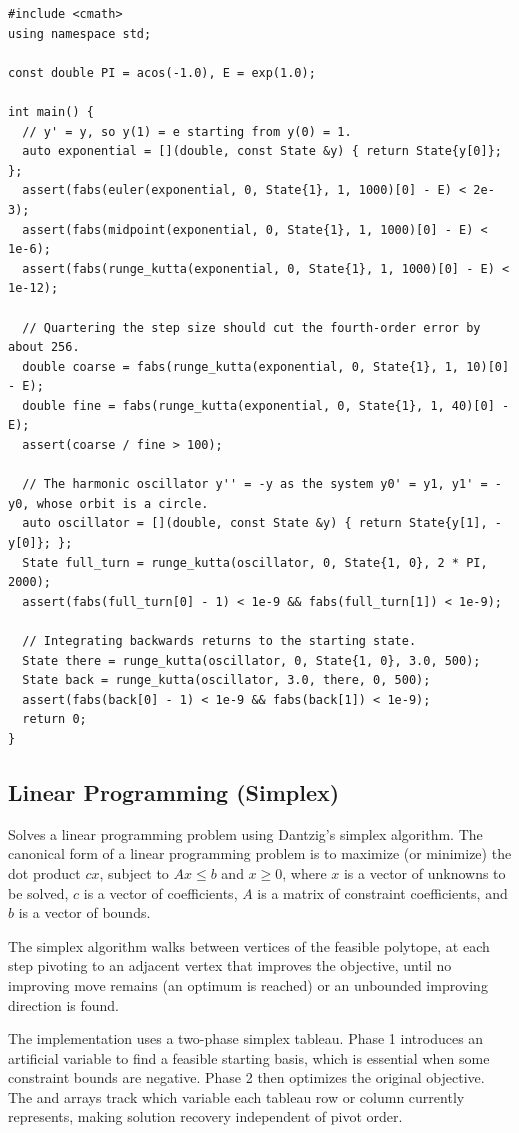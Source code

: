 \begin{lstlisting}[style=cpp]
#include <cmath>
using namespace std;

const double PI = acos(-1.0), E = exp(1.0);

int main() {
  // y' = y, so y(1) = e starting from y(0) = 1.
  auto exponential = [](double, const State &y) { return State{y[0]}; };
  assert(fabs(euler(exponential, 0, State{1}, 1, 1000)[0] - E) < 2e-3);
  assert(fabs(midpoint(exponential, 0, State{1}, 1, 1000)[0] - E) < 1e-6);
  assert(fabs(runge_kutta(exponential, 0, State{1}, 1, 1000)[0] - E) < 1e-12);

  // Quartering the step size should cut the fourth-order error by about 256.
  double coarse = fabs(runge_kutta(exponential, 0, State{1}, 1, 10)[0] - E);
  double fine = fabs(runge_kutta(exponential, 0, State{1}, 1, 40)[0] - E);
  assert(coarse / fine > 100);

  // The harmonic oscillator y'' = -y as the system y0' = y1, y1' = -y0, whose orbit is a circle.
  auto oscillator = [](double, const State &y) { return State{y[1], -y[0]}; };
  State full_turn = runge_kutta(oscillator, 0, State{1, 0}, 2 * PI, 2000);
  assert(fabs(full_turn[0] - 1) < 1e-9 && fabs(full_turn[1]) < 1e-9);

  // Integrating backwards returns to the starting state.
  State there = runge_kutta(oscillator, 0, State{1, 0}, 3.0, 500);
  State back = runge_kutta(oscillator, 3.0, there, 0, 500);
  assert(fabs(back[0] - 1) < 1e-9 && fabs(back[1]) < 1e-9);
  return 0;
}
\end{lstlisting}
\subsection{Linear Programming (Simplex)}
\label{sec:5.4.8}
Solves a linear programming problem using Dantzig's simplex algorithm. The canonical form of a linear programming problem is to maximize (or minimize) the dot product $cx$, subject to $Ax \leq b$ and $x \geq 0$, where $x$ is a vector of unknowns to be solved, $c$ is a vector of coefficients, $A$ is a matrix of constraint coefficients, and $b$ is a vector of bounds.

The simplex algorithm walks between vertices of the feasible polytope, at each step pivoting to an adjacent vertex that improves the objective, until no improving move remains (an optimum is reached) or an unbounded improving direction is found.

The implementation uses a two-phase simplex tableau. Phase 1 introduces an artificial variable to find a feasible starting basis, which is essential when some constraint bounds are negative. Phase 2 then optimizes the original objective. The  and  arrays track which variable each tableau row or column currently represents, making solution recovery independent of pivot order.

